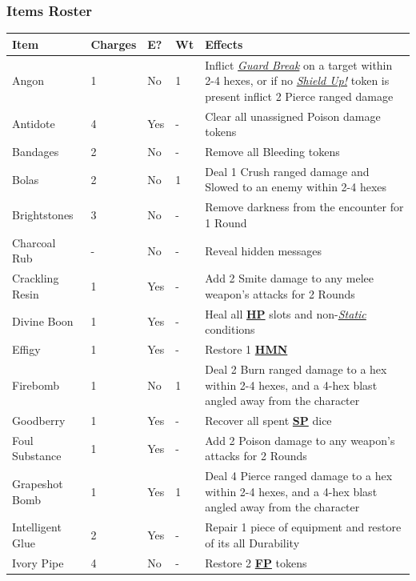 \documentclass[12pt]{article}
\newcommand{\refto}[1]{\hyperlink{#1}{\textbf{#1}}}
\newcommand{\reftoit}[1]{\hyperlink{#1}{\emph{#1}}}
\begin{document}
\subsubsection*{Items Roster}
\begin{center}
\begin{tabularx}{\textwidth}{p{}p{}p{}p{}p{}}
\hline
\rowcolor{white} \textbf{Item} & \textbf{Charges} & \textbf{E?} & \textbf{Wt} & \textbf{Effects}\setcounter{rownum}{0}\\
\hline
Angon & 1 & No & 1 & Inflict \reftoit{Guard Break} on a target within 2-4 hexes, or if no \reftoit{Shield Up!} token is present inflict 2 Pierce ranged damage\\
Antidote & 4 & Yes & - & Clear all unassigned Poison damage tokens \\
Bandages & 2 & No & - & Remove all Bleeding tokens \\
Bolas & 2 & No & 1 & Deal 1 Crush ranged damage and Slowed to an enemy within 2-4 hexes\\
Brightstones & 3 & No & - & Remove darkness from the encounter for 1 Round\\
Charcoal Rub & - & No & - & Reveal hidden messages\\
Crackling Resin & 1 & Yes & - & Add 2 Smite damage to any melee weapon’s attacks for 2 Rounds \\
Divine Boon & 1 & Yes & - & Heal all \refto{HP} slots and non-\reftoit{Static} conditions\\
Effigy & 1 & Yes & - & Restore 1 \refto{HMN}\\
Firebomb & 1 & No & 1 & Deal 2 Burn ranged damage to a hex within 2-4 hexes, and a 4-hex blast angled away from the character \\
Goodberry & 1 & Yes & - & Recover all spent \refto{SP} dice \\
Foul Substance & 1 & Yes & - & Add 2 Poison damage to any weapon’s attacks for 2 Rounds \\
Grapeshot Bomb & 1 & Yes & 1 & Deal 4 Pierce ranged damage to a hex within 2-4 hexes, and a 4-hex blast angled away from the character \\
Intelligent Glue & 2 & Yes & - & Repair 1 piece of equipment and restore of its all Durability\\
Ivory Pipe & 4 & No & - & Restore 2 \refto{FP} tokens \\
\hline
\end{tabularx}
\end{center}
\end{document}
